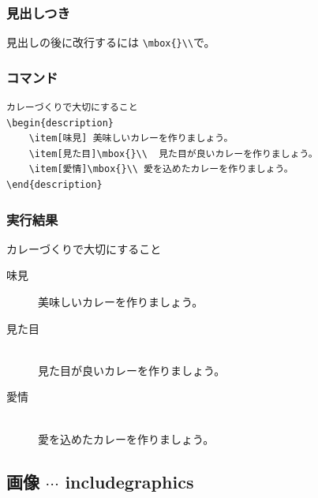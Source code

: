 \documentclass[a4j, titlepage]{jarticle}
\begin{document}
\subsubsection{見出しつき}
見出しの後に改行するには \verb|\mbox{}\\|で。
\begin{multicols}{2}

\subsubsection*{コマンド}
\begin{lstlisting}
カレーづくりで大切にすること
\begin{description}
    \item[味見] 美味しいカレーを作りましょう。
    \item[見た目]\mbox{}\\  見た目が良いカレーを作りましょう。
    \item[愛情]\mbox{}\\ 愛を込めたカレーを作りましょう。
\end{description}
\end{lstlisting}

\vfill\null
\columnbreak

\subsubsection*{実行結果}
\begin{screen}

カレーづくりで大切にすること
\begin{description}
    \item[味見] 美味しいカレーを作りましょう。
    \item[見た目]\mbox{}\\  見た目が良いカレーを作りましょう。
    \item[愛情]\mbox{}\\ 愛を込めたカレーを作りましょう。
\end{description}

\end{screen}
\end{multicols}


\subsection{画像 $\cdots$ includegraphics}
\end{document}
